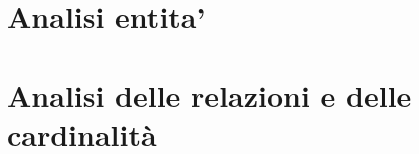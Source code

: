 \section{Analisi entita'}\label{analisi_entita}
    
    
\section{Analisi delle relazioni e delle cardinalità}
	